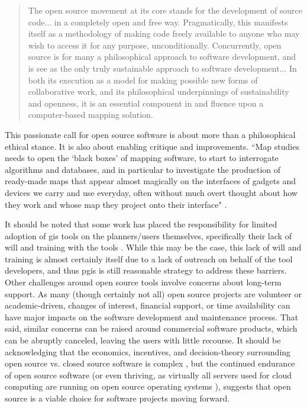 \blockquote{The open source movement at its core stands for the development of source code... in a completely open and free way. Pragmatically, this manifests itself as a methodology of making code freely available to anyone who may wish to access it for any purpose, unconditionally. Concurrently, open source is for many a philosophical approach to software development, and is see as the only truly sustainable approach to software development... In both its execution as a model for making possible new forms of collaborative work, and its philosophical underpinnings of sustainability and openness, it is an essential component in and fluence upon a computer-based mapping solution.}

This passionate call for open source software is about more than a philosophical ethical stance. It is also about enabling critique and improvements. ``Map studies needs to open the `black boxes' of mapping software, to start to interrogate algorithms and databases, and in particular to investigate the production of ready-made maps that appear almost magically on the interfaces of gadgets and devices we carry and use everyday, often without much overt thought about how they work and whose map they project onto their interface" \cite{dodgeMappingModesMethods2011}.

It should be noted that some work has placed the responsibility for limited adoption of \ac{gis} tools on the planners/users themselves, specifically their lack of will and training with the tools \cite{gocmenBarriersGISUse2010}. While this may be the case, this lack of will and training is almost certainly itself due to a lack of outreach on behalf of the tool developers, and thus \ac{pgis} is still reasonable strategy to address these barriers. Other challenges around open source tools involve concerns about long-term support. As many (though certainly not all) open source projects are volunteer or academic-driven, changes of interest, financial support, or time availability can have major impacts on the software development and maintenance process. That said, similar concerns can be raised around commercial software products, which can be abruptly canceled, leaving the users with little recourse. It should be acknowledging that the economics, incentives, and decision-theory surrounding open source vs. closed source software is complex \cite{lernerSimpleEconomicsOpen2002}, but the continued endurance of open source software (or even thriving, as virtually all servers used for cloud computing are running on open source operating systems \cite{vermaUbuntuLinuxMost2015}), suggests that open source is a viable choice for software projects moving forward. 


